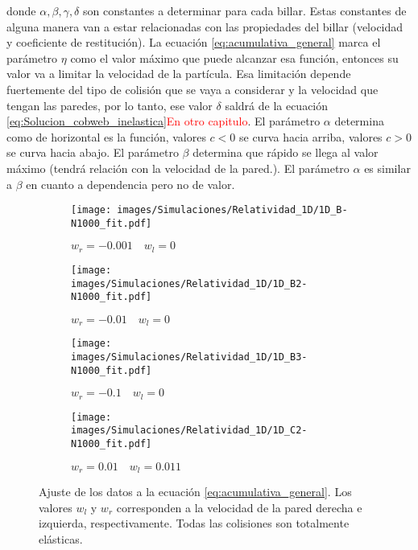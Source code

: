 \documentclass[11pt, spanish]{book}
\begin{document}
donde \( \alpha, \beta, \gamma, \delta \) son constantes a determinar para cada billar. Estas constantes de alguna manera van a estar relacionadas con las propiedades del billar (velocidad y coeficiente de restitución). La ecuación \ref{eq:acumulativa_general} marca el parámetro \( \eta \) como el valor máximo que puede alcanzar esa función, entonces su valor va a limitar la velocidad de la partícula. Esa limitación depende fuertemente del tipo de colisión que se vaya a considerar y la velocidad que tengan las paredes, por lo tanto, ese valor \( \delta \) saldrá de la ecuación \ref{eq:Solucion_cobweb_inelastica}\textcolor{red}{En otro capitulo}. El parámetro \( \alpha \) determina como de horizontal es la función, valores \( c < 0 \) se curva hacia arriba, valores \( c > 0 \) se curva hacia abajo. El parámetro \( \beta \) determina que rápido se llega al valor máximo (tendrá relación con la velocidad de la pared.). El parámetro \( \alpha \) es similar a \( \beta \) en cuanto a dependencia pero no de valor.

\vspace{3mm}

\begin{figure}[H]
    \begin{subfigure}[b]{0.5\textwidth}
        \centering
        \texttt{[image: images/Simulaciones/Relatividad\_1D/1D\_B-N1000\_fit.pdf]}
        \caption{$w_r = -0.001 \quad w_l = 0$}
    \end{subfigure}
    \hfill
    \begin{subfigure}[b]{0.5\textwidth}
        \centering
        \texttt{[image: images/Simulaciones/Relatividad\_1D/1D\_B2-N1000\_fit.pdf]}
        \caption{$w_r = -0.01 \quad w_l = 0$}
    \end{subfigure}
    \hfill
    \begin{subfigure}[b]{0.5\textwidth}
        \centering
        \texttt{[image: images/Simulaciones/Relatividad\_1D/1D\_B3-N1000\_fit.pdf]}
        \caption{$w_r = -0.1 \quad w_l = 0$}
    \end{subfigure}
    \hfill
    \begin{subfigure}[b]{0.5\textwidth}
        \centering
        \texttt{[image: images/Simulaciones/Relatividad\_1D/1D\_C2-N1000\_fit.pdf]}
        \caption{$w_r = 0.01 \quad w_l = 0.011$}
    \end{subfigure}
    \caption{Ajuste de los datos a la ecuación \ref{eq:acumulativa_general}. Los valores \( w_l \) y \( w_r \) corresponden a la velocidad de la pared derecha e izquierda, respectivamente. Todas las colisiones son totalmente elásticas.}
    \label{fig:ajuste_1D_relativity}
\end{figure}
\end{document}
